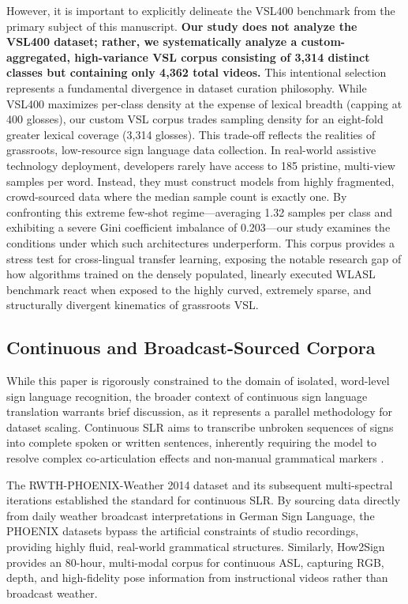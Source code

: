 \documentclass{ieeeaccess}
\DeclareRobustCommand{\textbf}[1]{{\bfseries #1}}
\begin{document}
However, it is important to explicitly delineate the VSL400 benchmark from the primary subject of this manuscript.
\textbf{Our study does not analyze the VSL400 dataset; rather, we systematically analyze a custom-aggregated, high-variance VSL corpus consisting of 3,314 distinct classes but containing only 4,362 total videos.} This intentional selection represents a fundamental divergence in dataset curation philosophy. While VSL400 maximizes per-class density at the expense of lexical breadth (capping at 400 glosses), our custom VSL corpus trades sampling density for an eight-fold greater lexical coverage (3,314 glosses).
This trade-off reflects the realities of grassroots, low-resource sign language data collection. In real-world assistive technology deployment, developers rarely have access to 185 pristine, multi-view samples per word. Instead, they must construct models from highly fragmented, crowd-sourced data where the median sample count is exactly one. By confronting this extreme few-shot regime—averaging 1.32 samples per class and exhibiting a severe Gini coefficient imbalance of 0.203—our study examines the conditions under which such architectures underperform. This corpus provides a stress test for cross-lingual transfer learning, exposing the notable research gap of how algorithms trained on the densely populated, linearly executed WLASL benchmark react when exposed to the highly curved, extremely sparse, and structurally divergent kinematics of grassroots VSL.

\subsection{Continuous and Broadcast-Sourced Corpora}
While this paper is rigorously constrained to the domain of isolated, word-level sign language recognition, the broader context of continuous sign language translation warrants brief discussion, as it represents a parallel methodology for dataset scaling. Continuous SLR aims to transcribe unbroken sequences of signs into complete spoken or written sentences, inherently requiring the model to resolve complex co-articulation effects and non-manual grammatical markers \cite{camgoz2018neural}.

The RWTH-PHOENIX-Weather 2014 dataset \cite{forster2012rwth} and its subsequent multi-spectral iterations \cite{koller2015continuous} established the standard for continuous SLR. By sourcing data directly from daily weather broadcast interpretations in German Sign Language, the PHOENIX datasets bypass the artificial constraints of studio recordings, providing highly fluid, real-world grammatical structures. Similarly, How2Sign \cite{duarte2021how2sign} provides an 80-hour, multi-modal corpus for continuous ASL, capturing RGB, depth, and high-fidelity pose information from instructional videos rather than broadcast weather.
\end{document}
